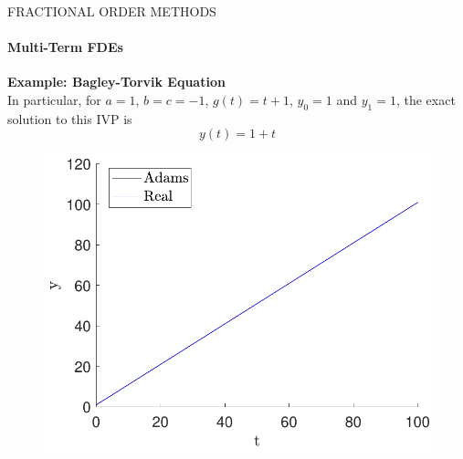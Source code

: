 \begin{frame}{FRACTIONAL ORDER METHODS}
\framesubtitle{Multi-Term FDEs}
    \textbf{Example: Bagley-Torvik Equation}\\\vspace{0.5cm}
    In particular, for $a=1$, $b=c=-1$, $g(t)=t+1$, $y_0=1$ and $y_1=1$, the exact solution to this IVP is 
    \begin{equation}
        y(t)=1+t
    \end{equation}
    \begin{figure}[H]
        \centering
        \includegraphics[scale=0.45]{files/abm_system.pdf}
    \end{figure}
\end{frame}





